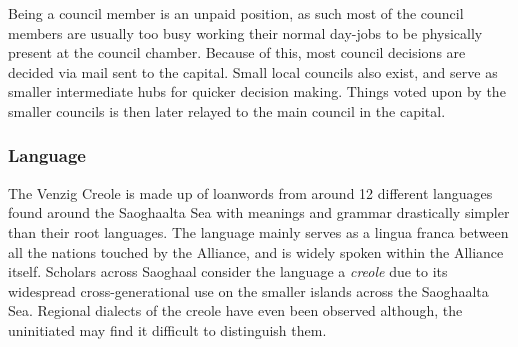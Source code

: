 Being a council member is an unpaid position, as such most of the council members are usually too busy working their normal day-jobs to be physically present at the council chamber.
Because of this, most council decisions are decided via mail sent to the capital.
Small local councils also exist, and serve as smaller intermediate hubs for quicker decision making.
Things voted upon by the smaller councils is then later relayed to the main council in the capital.

\subsubsection{Language}
The Venzig Creole is made up of loanwords from around 12 different languages found around the Saoghaalta Sea with meanings and grammar drastically simpler than their root languages.
The language mainly serves as a lingua franca between all the nations touched by the Alliance, and is widely spoken within the Alliance itself.
Scholars across Saoghaal consider the language a \textit{creole} due to its widespread cross-generational use on the smaller islands across the Saoghaalta Sea.
Regional dialects of the creole have even been observed although, the uninitiated may find it difficult to distinguish them.